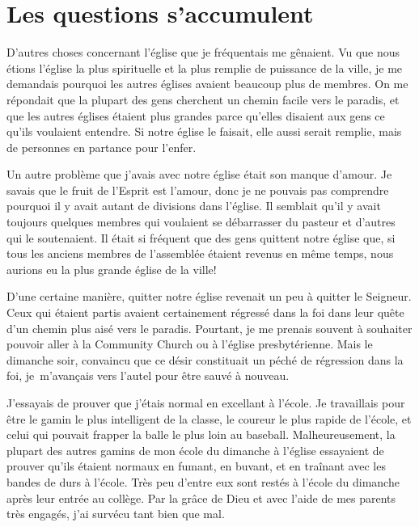 \section{Les questions s'accumulent}

D'autres choses concernant l'église que je fréquentais me gênaient.
 Vu que nous étions l'église la plus spirituelle et la plus remplie
 de puissance de la ville,
 je me demandais pourquoi les autres églises avaient beaucoup plus
 de membres. On me répondait que la plupart des
 gens cherchent un chemin facile vers le paradis, et que les autres églises
 étaient plus grandes parce qu'elles disaient aux gens ce qu'ils voulaient
 entendre. Si notre église le faisait, elle aussi serait remplie,
 mais de personnes en partance pour l'enfer.

Un autre problème que j'avais avec notre église était son manque d'amour. Je
 savais que le fruit de l'Esprit est l'amour,
 donc je ne pouvais pas comprendre
 pourquoi il y avait autant de divisions dans l'église. Il semblait
 qu'il y avait toujours quelques membres qui voulaient se débarrasser du pasteur et
 d'autres qui le soutenaient. Il était si fréquent que des gens quittent notre église que,
 si tous les anciens membres de l'assemblée étaient revenus en même temps, nous aurions
 eu la plus grande église de la ville!

D'une certaine manière, quitter notre église revenait un peu à quitter le
 Seigneur. Ceux qui étaient partis avaient certainement régressé dans la foi dans leur quête
 d'un chemin plus aisé vers le paradis. Pourtant, je me prenais souvent à
 souhaiter pouvoir aller à la \Og Community Church \Fg{} ou à l'église presbytérienne. Mais
 le dimanche soir, convaincu que ce désir constituait un péché de régression dans la foi,
 je~m'avançais vers l'autel pour être \Og sauvé \Fg{} à nouveau.
 
J'essayais de prouver que j'étais normal en excellant à l'école. Je travaillais
 pour être le gamin le plus intelligent de la classe, le coureur le plus rapide de
 l'école, et celui qui pouvait frapper la balle le plus loin au baseball.
 Malheureusement, la plupart des autres gamins de mon école du dimanche à l'église
 essayaient de prouver qu'ils étaient normaux en fumant, en buvant, et en
 traînant avec les bandes de durs à l'école. Très peu d'entre eux sont restés à
 l'école du dimanche après leur entrée au collège. Par la grâce de Dieu et avec
 l'aide de mes parents très engagés, j'ai survécu tant bien que mal.

